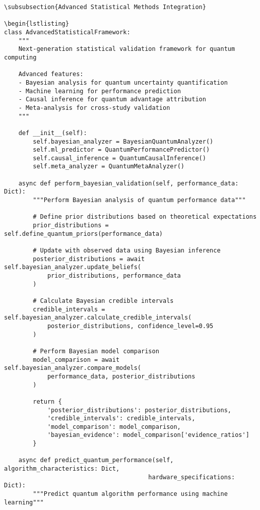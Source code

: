 \documentclass[12pt,a4paper]{report}
\begin{document}
\begin{lstlisting}
\subsubsection{Advanced Statistical Methods Integration}

\begin{lstlisting}
class AdvancedStatisticalFramework:
    """
    Next-generation statistical validation framework for quantum computing

    Advanced features:
    - Bayesian analysis for quantum uncertainty quantification
    - Machine learning for performance prediction
    - Causal inference for quantum advantage attribution
    - Meta-analysis for cross-study validation
    """

    def __init__(self):
        self.bayesian_analyzer = BayesianQuantumAnalyzer()
        self.ml_predictor = QuantumPerformancePredictor()
        self.causal_inference = QuantumCausalInference()
        self.meta_analyzer = QuantumMetaAnalyzer()

    async def perform_bayesian_validation(self, performance_data: Dict):
        """Perform Bayesian analysis of quantum performance data"""

        # Define prior distributions based on theoretical expectations
        prior_distributions = self.define_quantum_priors(performance_data)

        # Update with observed data using Bayesian inference
        posterior_distributions = await self.bayesian_analyzer.update_beliefs(
            prior_distributions, performance_data
        )

        # Calculate Bayesian credible intervals
        credible_intervals = self.bayesian_analyzer.calculate_credible_intervals(
            posterior_distributions, confidence_level=0.95
        )

        # Perform Bayesian model comparison
        model_comparison = await self.bayesian_analyzer.compare_models(
            performance_data, posterior_distributions
        )

        return {
            'posterior_distributions': posterior_distributions,
            'credible_intervals': credible_intervals,
            'model_comparison': model_comparison,
            'bayesian_evidence': model_comparison['evidence_ratios']
        }

    async def predict_quantum_performance(self, algorithm_characteristics: Dict,
                                        hardware_specifications: Dict):
        """Predict quantum algorithm performance using machine learning"""


\end{lstlisting}
\end{document}
